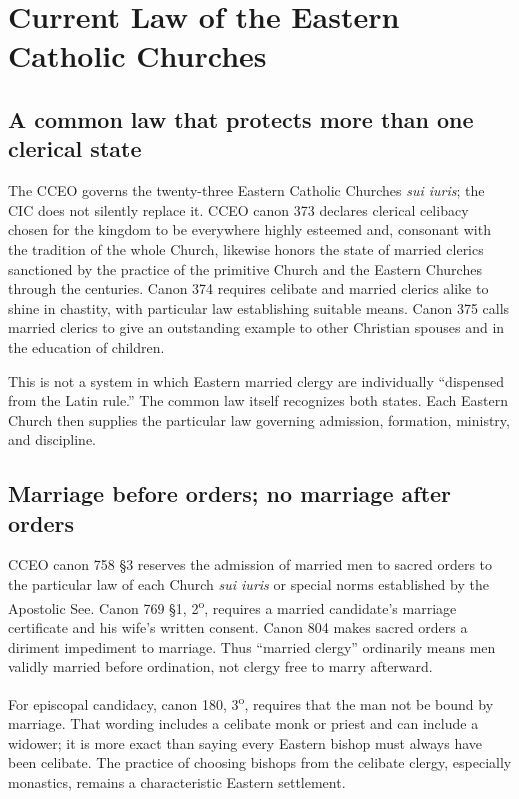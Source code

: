 \section{Current Law of the Eastern Catholic Churches}

\subsection{A common law that protects more than one clerical state}

The CCEO governs the twenty-three Eastern Catholic Churches \emph{sui iuris}; the CIC does not silently replace it. CCEO canon 373 declares clerical celibacy chosen for the kingdom to be everywhere highly esteemed and, consonant with the tradition of the whole Church, likewise honors the state of married clerics sanctioned by the practice of the primitive Church and the Eastern Churches through the centuries. Canon 374 requires celibate and married clerics alike to shine in chastity, with particular law establishing suitable means. Canon 375 calls married clerics to give an outstanding example to other Christian spouses and in the education of children.

This is not a system in which Eastern married clergy are individually ``dispensed from the Latin rule.'' The common law itself recognizes both states. Each Eastern Church then supplies the particular law governing admission, formation, ministry, and discipline.

\subsection{Marriage before orders; no marriage after orders}

CCEO canon 758 \S3 reserves the admission of married men to sacred orders to the particular law of each Church \emph{sui iuris} or special norms established by the Apostolic See. Canon 769 \S1, 2\textsuperscript{o}, requires a married candidate's marriage certificate and his wife's written consent. Canon 804 makes sacred orders a diriment impediment to marriage. Thus ``married clergy'' ordinarily means men validly married before ordination, not clergy free to marry afterward.

For episcopal candidacy, canon 180, 3\textsuperscript{o}, requires that the man not be bound by marriage. That wording includes a celibate monk or priest and can include a widower; it is more exact than saying every Eastern bishop must always have been celibate. The practice of choosing bishops from the celibate clergy, especially monastics, remains a characteristic Eastern settlement.

